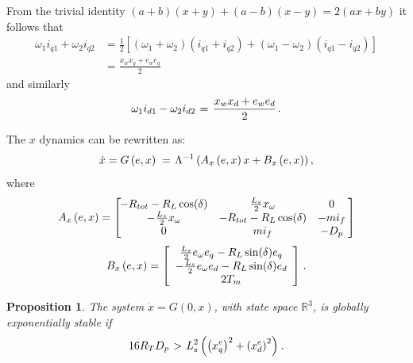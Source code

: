 \documentclass[letterpaper, 10 pt, conference]{ieeeconf}
\newtheorem{proposition}[theorem]{Proposition}
\newcommand{\rline}  {{\mathbb R}}
\renewcommand{\o}    {{\omega}}
\newcommand{\half}   {{\frac{1}{2}}}
\newcommand{\m}      {{\hbox{\hskip 1pt}}}
\newcommand{\nm}     {{\hbox{\hskip -3pt}}}
\begin{document}
From the trivial identity $(a+b)(x+y)+(a-b)(x-y)=2(ax+by)$ it 
follows that
$$ \begin{aligned} \o_1 i_{q1}+\o_2 i_{q2} &= \half\left[(\o_1+\o_2)
   (i_{q1}+i_{q2})+(\o_1-\o_2)(i_{q1}-i_{q2})\right]\\ & =\frac{x_{w}
   x_{q}+e_{w}e_{q}}{2} \end{aligned} $$
and similarly \vspace{-3mm}
$$ \o_1 i_{d1}-\o_2 i_{d2} \m=\m \frac{x_{w}x_{d}+e_{w}e_d}{2} \m.$$

The $x$ dynamics can be rewritten as:
$$ \dot{x}=G \left( e,x\right) \m=\m \Lambda^{-1}\left(A_x \left(e,x 
   \right) x + B_x \left( e,x\right) \right),$$
where
$$ A_x \left(e,x \right) = \left[\nm\nm\begin{array}{ccc}
   -R_{tot}-R_L\cos(\delta) & \frac{L_s}{2} x_\o & 0\\
   -\frac{L_s}{2} x_\o & -R_{tot}-R_L\cos(\delta) & -mi_f\\
   0 & mi_f & -D_p\end{array} \nm\right]$$
$$ B_x \left(e,x \right)=\left[\begin{array}{c}
   \frac{L_{s}}{2}e_{\omega}e_{q}-R_{L}\sin(\delta)e_{q}\\
   -\frac{L_{s}}{2}e_{\omega}e_{d}-R_{L}\sin(\delta)e_{d}\\
   2T_{m} \end{array}\right] \m.$$

\begin{proposition} \label{megyek_Sde_Bokerbe}
The system $\dot x=G(0,x)$, with state space $\rline^3$, is 
globally exponentially stable if 
\begin{equation} \label{eq:condition_for_stable_G}
   16 R_T D_p \m>\m L_s^2 \left( \left(x_q^e\right)^2+\left( x_d^e
   \right)^2\right) \m.
\end{equation}
\end{proposition}
\end{document}
